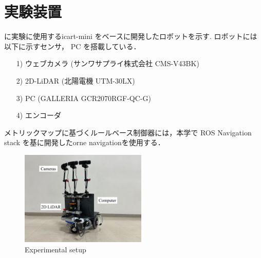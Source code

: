 \section{実験装置}
 に実験に使用するicart-mini\cite{icart} をベースに開発したロボットを示す.
ロボットには以下に示すセンサ， PC を搭載している．
\begin{enumerate}
    \item [1)] ウェブカメラ (サンワサプライ株式会社 CMS-V43BK) 
    \item [2)] 2D-LiDAR (北陽電機 UTM-30LX)
    \item [3)] PC (GALLERIA GCR2070RGF-QC-G)
    \item [4)] エンコーダ
\end{enumerate}
メトリックマップに基づくルールベース制御器には，本学で ROS Navigation stack を基に開発したorne navigation\cite{orne_nav}を使用する．

\begin{figure}[htbp]
    \centering
     \includegraphics[width=60mm]{images/pdf/ishiguro/gamma.pdf}
     \caption{Experimental setup}
     \label{fig:gamma}
\end{figure}